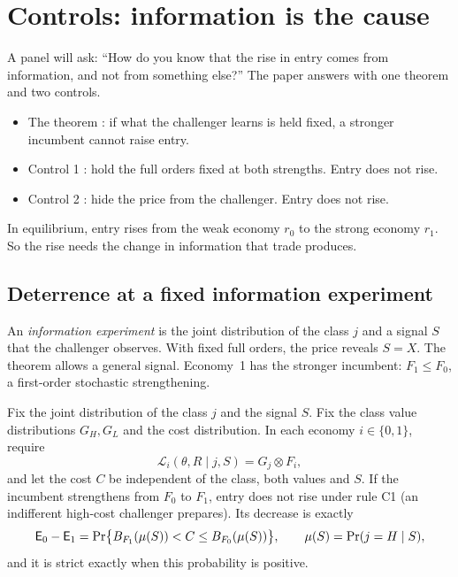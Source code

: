 \section{Controls: information is the cause}\label{sec:07_controls}

A panel will ask: ``How do you know that the rise in entry comes from information, and not from something
else?'' The paper answers with one theorem and two controls.
\begin{itemize}[leftmargin=2em]
\item The theorem : if what the challenger learns is held fixed, a stronger incumbent cannot raise
entry.
\item Control 1 : hold the full orders fixed at both strengths. Entry does not rise.
\item Control 2 : hide the price from the challenger. Entry does not rise.
\end{itemize}
In equilibrium, entry rises from the weak economy \(r_0\) to the strong economy \(r_1\). So the rise needs the
change in information that trade produces.

\subsection{Deterrence at a fixed information experiment}\label{sec:07_controls-fixed}

An \emph{information experiment} is the joint distribution of the class \(j\) and a signal \(S\) that the challenger observes.
With fixed full orders, the price reveals \(S=X\). The theorem allows a general signal. Economy~1 has the stronger
incumbent: \(F_1\le F_0\), a first-order stochastic strengthening.

\begin{resultbox}
Fix the joint distribution of the class \(j\) and the signal \(S\). Fix the class value distributions \(G_H,G_L\) and the cost distribution. In
each economy \(i\in\{0,1\}\), require
\begin{equation}\label{eq:07-product}
\mathcal L_i(\theta,R\mid j,S)=G_j\otimes F_i ,
\end{equation}
and let the cost \(C\) be independent of the class, both values and \(S\). If the incumbent strengthens from \(F_0\)
to \(F_1\), entry does not rise under rule C1 (an indifferent high-cost challenger prepares). Its decrease is exactly
\[
\mathsf{E}_0-\mathsf{E}_1=\Pr\bigl\{B_{F_1}(\mu(S))<C\le B_{F_0}(\mu(S))\bigr\},\qquad \mu(S)=\Pr(j=H\mid S),
\]
and it is strict exactly when this probability is positive.
\end{resultbox}

